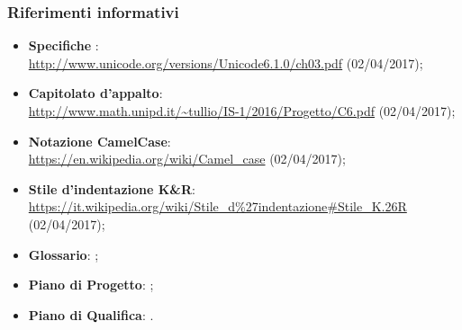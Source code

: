 \documentclass[../NormeDiProgetto.tex]{subfiles}
\begin{document}
			\subsubsection{Riferimenti informativi}	
				\begin{itemize}
					\item \textbf{Specifiche }:\\
					\url{http://www.unicode.org/versions/Unicode6.1.0/ch03.pdf} (02/04/2017);
					\item \textbf{Capitolato d'appalto}:\\
					\url{http://www.math.unipd.it/~tullio/IS-1/2016/Progetto/C6.pdf} (02/04/2017);
					\item \textbf{Notazione CamelCase}:\\
					\url{https://en.wikipedia.org/wiki/Camel_case} (02/04/2017);
					\item \textbf{Stile d'indentazione K\&R}:\\
					\url{https://it.wikipedia.org/wiki/Stile_d\%27indentazione#Stile_K.26R} (02/04/2017);
					\item \textbf{Glossario}: \glossariov;
					\item \textbf{Piano di Progetto}: \pianodiprogettov;
					\item \textbf{Piano di Qualifica}: \pianodiqualificav.
				\end{itemize}
\end{document}
